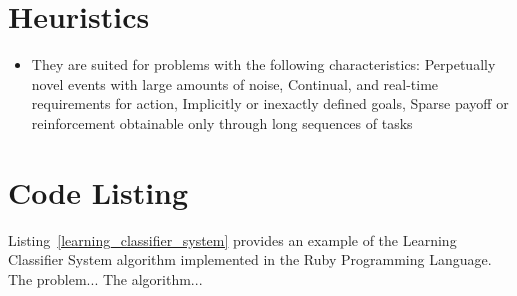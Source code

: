 \documentclass[a4paper, 11pt]{article}
\begin{document}
\section{Heuristics}
\label{sec:heuristics}
\begin{itemize}
	\item They are suited for problems with the following characteristics: Perpetually novel events with large amounts of noise, Continual, and real-time requirements for action, Implicitly or inexactly defined goals, Sparse payoff or reinforcement obtainable only through long sequences of tasks
\end{itemize}

\section{Code Listing}
\label{sec:code}
Listing~\ref{learning_classifier_system} provides an example of the Learning Classifier System algorithm implemented in the Ruby Programming Language. 
The problem...
The algorithm...




\end{document}
